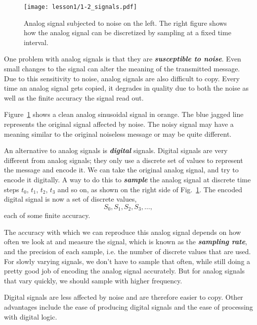 \begin{figure}[t]
    \centering
    \texttt{[image: lesson1/1-2\_signals.pdf]}
    \caption[Continuous and discrete signals.]{Analog signal subjected to noise on the left. The right figure shows how the analog signal can be discretized by sampling at a fixed time interval.}
    \label{fig:1-2_signals}
\end{figure}

One problem with analog signals is that they are \textit{\textbf{susceptible to noise}}.
Even small changes to the signal can alter the meaning of the transmitted message.
Due to this sensitivity to noise, analog signals are also difficult to copy.
Every time an analog signal gets copied, it degrades in quality due to both the noise as well as the finite accuracy the signal read out.

Figure~\ref{fig:1-2_signals} shows a clean analog sinusoidal signal in orange.
The blue jagged line represents the original signal affected by noise.
The noisy signal may have a meaning similar to the original noiseless message or may be quite different.

An alternative to analog signals is \textit{\textbf{digital}} signals.
Digital signals are very different from analog signals; they only use a discrete set of values to represent the message and encode it.
We can take the original analog signal, and try to encode it digitally.
A way to do this to \textit{\textbf{sample}} the analog signal at discrete time steps $t_0$, $t_1$, $t_2$, $t_3$ and so on, as shown on the right side of Fig.~\ref{fig:1-2_signals}.
The encoded digital signal is now a set of discrete values,
\begin{equation}
    S_0, S_1, S_2, S_3, \ldots,
\end{equation}
each of some finite accuracy.

The accuracy with which we can reproduce this analog signal depends on how often we look at and measure the signal, which is known as the \textit{\textbf{sampling rate}}, and the precision of each sample, i.e. the number of discrete values that are used.
For slowly varying signals, we don't have to sample that often, while still doing a pretty good job of encoding the analog signal accurately.
But for analog signals that vary quickly, we should sample with higher frequency.

Digital signals are less affected by noise and are therefore easier to copy.
Other advantages include the ease of producing digital signals and the ease of processing with digital logic.


